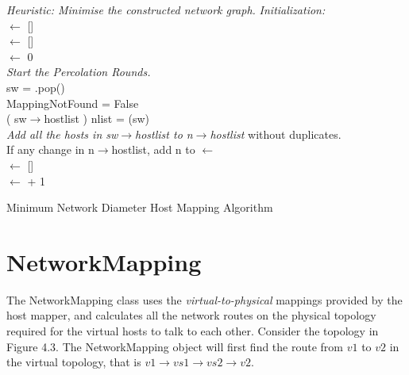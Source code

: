 \IncMargin{1em}
\begin{algorithm}
  \emph{Heuristic: Minimise the constructed network graph.}
  \BlankLine
  \emph{Initialization:}\\
  	\swl $\leftarrow$  [] \\
  	\swll $\leftarrow$ [] \\
  	\round $\leftarrow$ 0 \\
	\emph{Start the Percolation Rounds.}\\
   {
  		 {
  				sw = \swl.pop() \\
  				 {
  					MappingNotFound = False \\
  					\mapHosts ( sw$\rightarrow$hostlist )
  				}
  				nlist = \neighbours(sw) \\
  				 {
  					\emph{Add all the hosts in sw$\rightarrow$hostlist to n$\rightarrow$hostlist} without duplicates.\\ 
  					If any change in n$\rightarrow$hostlist, add n to \swll
  				}			
  		}
  		\swl $\leftarrow$ \swll \\
  		\swll $\leftarrow$ [] \\
  		\round $\leftarrow$ \round + 1
	}
  \caption{Minimum Network Diameter Host Mapping Algorithm}\label{algo_disjdecomp}
\end{algorithm}\DecMargin{1em}

\section{NetworkMapping}
The NetworkMapping class uses the \emph{virtual-to-physical} mappings provided by the host mapper, and calculates all the network routes on the physical topology required for the virtual hosts to talk to each other. Consider the topology in Figure 4.3. The NetworkMapping object will first find the route from $v1$ to $v2$ in the virtual topology, that is $v1 \rightarrow vs1 \rightarrow vs2 \rightarrow v2$.  \\

